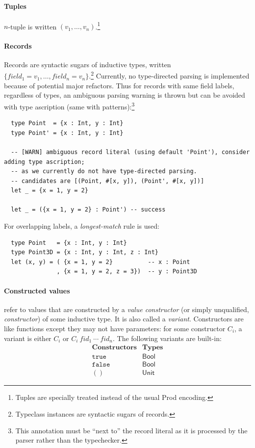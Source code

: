 \documentclass[a4paper, 11pt]{article}
\theoremstyle{remark}\newtheorem*{remark}{Remark}
\theoremstyle{definition}\newtheorem*{definition}{Definition}
\begin{document}
\paragraph*{Tuples} \(n\)-tuple is written \((v_1,\dots,v_n)\).\footnote{Tuples are specially treated instead of the usual \textsf{Prod} encoding.}
\paragraph*{Records} Records are syntactic sugars of inductive types, written
\(\{field_1 = v_1,\dots,field_n=v_n\}\).\footnote{Typeclass instances are syntactic sugars of records.}
Currently, no type-directed parsing is implemented because of potential major refactors. Thus for
records with same field labels, regardless of types, an ambiguous parsing warning is thrown but
can be avoided with type
ascription (same with patterns):\footnote{This annotation must be ``next to'' the record literal
as it is processed by the parser rather than the typechecker.}
\begin{verbatim}
  type Point  = {x : Int, y : Int}
  type Point' = {x : Int, y : Int}

  -- [WARN] ambiguous record literal (using default 'Point'), consider adding type ascription;
  -- as we currently do not have type-directed parsing.
  -- candidates are [(Point, #[x, y]), (Point', #[x, y])]
  let _ = {x = 1, y = 2}

  let _ = ({x = 1, y = 2} : Point') -- success
\end{verbatim}
For overlapping labels, a \emph{longest-match} rule is used:
\begin{verbatim}
  type Point   = {x : Int, y : Int}
  type Point3D = {x : Int, y : Int, z : Int}
  let (x, y) = ( {x = 1, y = 2}          -- x : Point
               , {x = 1, y = 2, z = 3})  -- y : Point3D
\end{verbatim}
\paragraph*{Constructed values} refer to values that are constructed by a
\emph{value constructor} (or simply unqualified, \emph{constructor}) of some inductive type.
It is also called a \emph{variant}. Constructors are like functions except they may
not have parameters: for some constructor \(C_i\), a variant is either \(C_i\) or \(C_i\ fid_1\ \cdots\ fid_n\). The following
variants are built-in:
\[
  \begin{matrix}
    \mathbf{Constructors} & \mathbf{Types} \\
    \mathtt{true}         & \mathsf{Bool}  \\
    \mathtt{false}        & \mathsf{Bool}  \\
    \mathtt{()}           & \mathsf{Unit}
  \end{matrix}
\]
\end{document}
